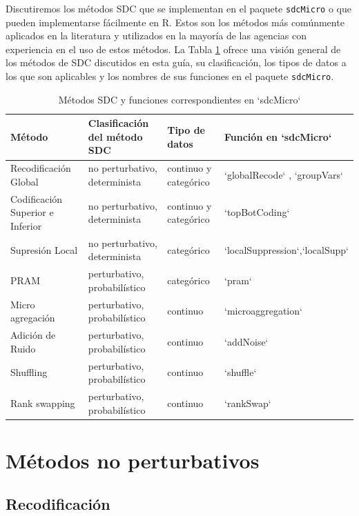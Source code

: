 \documentclass[]{book}
\theoremstyle{definition}
\theoremstyle{definition}
\theoremstyle{definition}
\theoremstyle{definition}
\theoremstyle{remark}
\begin{document}
Discutiremos los métodos SDC que se implementan en el paquete \texttt{sdcMicro} o que pueden implementarse fácilmente en R. Estos son los métodos más comúnmente aplicados en la literatura y utilizados en la mayoría de las agencias con experiencia en el uso de estos métodos. La Tabla \ref{tab:Tabla6} ofrece una visión general de los métodos de SDC discutidos en esta guía, su clasificación, los tipos de datos a los que son aplicables y los nombres de sus funciones en el paquete \texttt{sdcMicro}.

\begin{table}

\caption{\label{tab:Tabla6}\label{tab:Tabla6}Métodos SDC y funciones correspondientes en `sdcMicro` 
}
\centering
\begin{tabular}[t]{llll}
\toprule
Método & Clasificación   del método SDC & Tipo de datos & Función en   `sdcMicro`\\
\midrule
Recodificación Global & no   perturbativo, determinista & continuo   y categórico & `globalRecode` , `groupVars`\\
Codificación Superior e Inferior & no   perturbativo, determinista & continuo   y categórico & `topBotCoding`\\
Supresión Local & no   perturbativo, determinista & categórico & `localSuppression`,`localSupp`\\
PRAM & perturbativo,   probabilístico & categórico & `pram`\\
Micro agregación & perturbativo,   probabilístico & continuo & `microaggregation`\\
\addlinespace
Adición de Ruido & perturbativo,   probabilístico & continuo & `addNoise`\\
Shuffling & perturbativo,   probabilístico & continuo & `shuffle`\\
Rank swapping & perturbativo,   probabilístico & continuo & `rankSwap`\\
\bottomrule
\end{tabular}
\end{table}

\hypertarget{muxe9todos-no-perturbativos}{%
\section{Métodos no perturbativos}\label{muxe9todos-no-perturbativos}}

\hypertarget{recodificaciuxf3n}{%
\subsection{Recodificación}\label{recodificaciuxf3n}}
\end{document}
